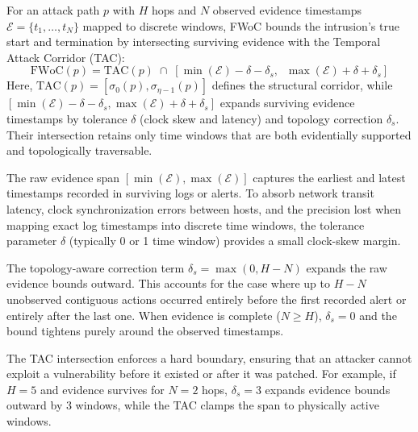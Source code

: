 \documentclass[12pt]{article}
\begin{document}
For an attack path $p$ with $H$ hops and $N$ observed evidence timestamps $\mathcal{E} = \{t_1, \dots, t_N\}$ mapped to discrete windows, FWoC bounds the intrusion's true start and termination by intersecting surviving evidence with the Temporal Attack Corridor (TAC):
\begin{equation}\label{eq:fwoc}
\text{FWoC}(p) = \text{TAC}(p) \;\cap\; \left[\min(\mathcal{E}) - \delta - \delta_s,\;\;\max(\mathcal{E}) + \delta + \delta_s\right]
\end{equation}
Here, $\text{TAC}(p) = [\sigma_0(p), \sigma_{\eta-1}(p)]$ defines the structural corridor, while $[\min(\mathcal{E}) - \delta - \delta_s, \max(\mathcal{E}) + \delta + \delta_s]$ expands surviving evidence timestamps by tolerance $\delta$ (clock skew and latency) and topology correction $\delta_s$. Their intersection retains only time windows that are both evidentially supported and topologically traversable.

The raw evidence span $[\min(\mathcal{E}), \max(\mathcal{E})]$ captures the earliest and latest timestamps recorded in surviving logs or alerts. To absorb network transit latency, clock synchronization errors between hosts, and the precision lost when mapping exact log timestamps into discrete time windows, the tolerance parameter $\delta$ (typically 0 or 1 time window) provides a small clock-skew margin.

The topology-aware correction term $\delta_s = \max(0, H - N)$ expands the raw evidence bounds outward.\label{sec:worst-case-bounds} This accounts for the case where up to $H - N$ unobserved contiguous actions occurred entirely before the first recorded alert or entirely after the last one. When evidence is complete ($N \ge H$), $\delta_s = 0$ and the bound tightens purely around the observed timestamps.

The TAC intersection enforces a hard boundary, ensuring that an attacker cannot exploit a vulnerability before it existed or after it was patched. For example, if $H=5$ and evidence survives for $N=2$ hops, $\delta_s=3$ expands evidence bounds outward by 3 windows, while the TAC clamps the span to physically active windows.
\end{document}
